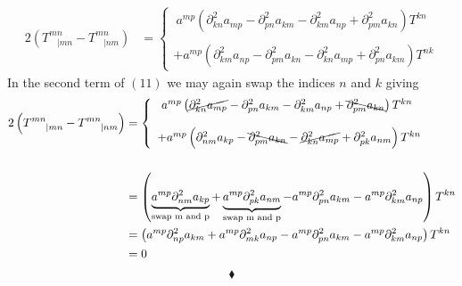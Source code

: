 \begin{align}
2\left(T^{mn}_{\ \ \ \ |mn}-T^{mn}_{\ \ \ \ |nm}\right) 
&= \left\{\begin{array}{l} \ a^{mp} \left( \partial^2_{kn} a_{mp} - \partial^2_{pn} a_{km} - \partial^2_{km} a_{np} + \partial^2_{pm} a_{kn}  \right) T^{kn}  \\\\  + a^{mp} \left( \partial^2_{km} a_{np}  - \partial^2_{pm} a_{kn}- \partial^2_{kn} a_{mp} + \partial^2_{pn} a_{km}\right)T^{nk} \end{array}\right.
\end{align}
In the second term of $(11)$ we may again swap the indices $n$ and $k$ giving
\begin{align}
2\left(T^{mn}_{\ \ \ \ |mn}-T^{mn}_{\ \ \ \ |nm}\right) 
&= \left\{\begin{array}{l} \ a^{mp} \left( \cancel{\partial^2_{kn} a_{mp}} - \partial^2_{pn} a_{km} - \partial^2_{km} a_{np} + \bcancel{\partial^2_{pm} a_{kn} } \right) T^{kn}  \\\\  + a^{mp} \left( \partial^2_{nm} a_{kp}  - \bcancel{\partial^2_{pm} a_{kn}}- \cancel{\partial^2_{kn} a_{mp}} + \partial^2_{pk} a_{nm}\right)T^{kn} \end{array}\right.\\\\
&=  \left( \underbrace{a^{mp}\partial^2_{nm} a_{kp}}_{\text{swap m and p}}  + \underbrace{a^{mp}\partial^2_{pk} a_{nm}}_{\text{swap m and p}} - a^{mp}\partial^2_{pn} a_{km} -a^{mp} \partial^2_{km} a_{np} \right) T^{kn}\\
&=  \left( a^{mp}\partial^2_{np} a_{km}  + a^{mp}\partial^2_{mk} a_{np} - a^{mp}\partial^2_{pn} a_{km} -a^{mp} \partial^2_{km} a_{np} \right) T^{kn}\\
&=0
\end{align}
$$\blacklozenge$$
\newpage
